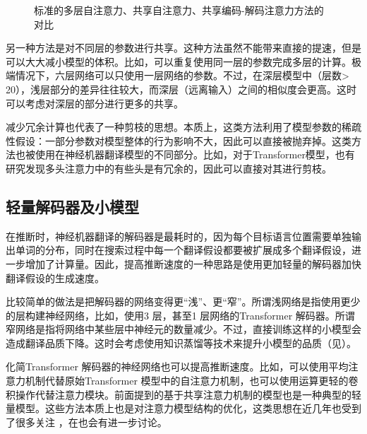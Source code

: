 \begin{figure}[htp]
\centering

\caption{标准的多层自注意力、共享自注意力、共享编码-解码注意力方法的对比}
\label{fig:14-6}
\end{figure}

\parinterval 另一种方法是对不同层的参数进行共享。这种方法虽然不能带来直接的提速，但是可以大大减小模型的体积。比如，可以重复使用同一层的参数完成多层的计算。极端情况下，六层网络可以只使用一层网络的参数。不过，在深层模型中（层数> 20），浅层部分的差异往往较大，而深层（远离输入）之间的相似度会更高。这时可以考虑对深层的部分进行更多的共享。

\parinterval 减少冗余计算也代表了一种剪枝的思想。本质上，这类方法利用了模型参数的稀疏性假设：一部分参数对模型整体的行为影响不大，因此可以直接被抛弃掉。这类方法也被使用在神经机器翻译模型的不同部分。比如，对于Transformer模型，也有研究发现多头注意力中的有些头是有冗余的，因此可以直接对其进行剪枝。


\subsection{轻量解码器及小模型}

\parinterval 在推断时，神经机器翻译的解码器是最耗时的，因为每个目标语言位置需要单独输出单词的分布，同时在搜索过程中每一个翻译假设都要被扩展成多个翻译假设，进一步增加了计算量。因此，提高推断速度的一种思路是使用更加轻量的解码器加快翻译假设的生成速度。

\parinterval 比较简单的做法是把解码器的网络变得更“浅”、更“窄”。所谓浅网络是指使用更少的层构建神经网络，比如，使用3 层，甚至1 层网络的Transformer 解码器。所谓窄网络是指将网络中某些层中神经元的数量减少。不过，直接训练这样的小模型会造成翻译品质下降。这时会考虑使用知识蒸馏等技术来提升小模型的品质（见{\chapterthirteen}）。

\parinterval 化简Transformer 解码器的神经网络也可以提高推断速度。比如，可以使用平均注意力机制代替原始Transformer 模型中的自注意力机制，也可以使用运算更轻的卷积操作代替注意力模块。前面提到的基于共享注意力机制的模型也是一种典型的轻量模型。这些方法本质上也是对注意力模型结构的优化，这类思想在近几年也受到了很多关注 ，在{\chapterfifteen}也会有进一步讨论。

